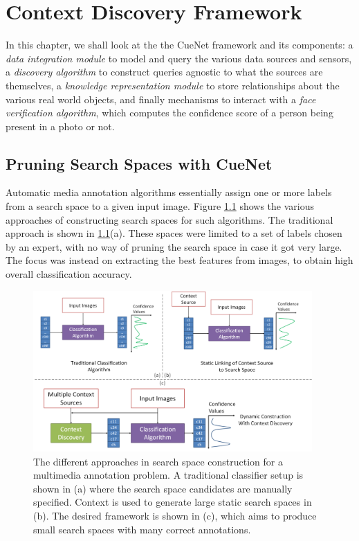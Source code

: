 \chapter{Context Discovery Framework}

In this chapter, we shall look at the the CueNet framework and its components: a \textit{data integration module} to model and query the various data sources and sensors, a \textit{discovery algorithm} to construct queries agnostic to what the sources are themselves, a \textit{knowledge representation module} to store relationships about the various real world objects, and finally mechanisms to interact with a \textit{face verification algorithm}, which computes the confidence score of a person being present in a photo or not.

\section{Pruning Search Spaces with CueNet}

Automatic media annotation algorithms essentially assign one or more labels from a search space to a given input image. Figure \ref{fig:with-without-cuenet} shows the various approaches of constructing search spaces for such algorithms. The traditional approach is shown in \ref{fig:with-without-cuenet}(a). These spaces were limited to a set of labels chosen by an expert, with no way of pruning the search space in case it got very large. 
The focus was instead on extracting the best features from images, to obtain high overall classification accuracy\cite{turk1991eigenfaces}.

\begin{figure}[t]
\centering
\includegraphics[width=0.95\textwidth]{media/with-without-cuenet-2.png}
\caption{The different approaches in search space construction for a multimedia annotation problem. A traditional classifier setup is shown in (a) where the search space candidates are manually specified. Context is used to generate large static search spaces in (b). The desired framework is shown in (c), which aims to produce small search spaces with many correct annotations.}
\label{fig:with-without-cuenet}
\end{figure}

